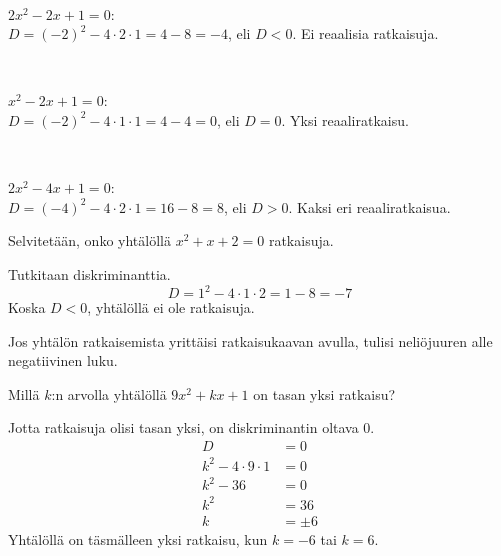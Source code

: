 \begin{esimerkki}
\ \\
\parbox{4.5cm}{
\begin{kuvaajapohja}{1}{-1}{3}{-1}{3}
\end{kuvaajapohja}
}
\parbox{6cm}{$2x^2-2x+1=0$:\\$D=(-2)^2-4 \cdot 2 \cdot 1=4-8=-4$, eli $D <0$. Ei reaalisia ratkaisuja.}
\\
\parbox{4.5cm}{
\begin{kuvaajapohja}{1}{-1}{3}{-1}{3}
\end{kuvaajapohja}
}
\parbox{6cm}{$x^2-2x+1=0$:\\$D=(-2)^2-4 \cdot 1 \cdot 1=4-4=0$, eli $D = 0$. Yksi reaaliratkaisu.}
\\
\parbox{4.5cm}{
\begin{kuvaajapohja}{1}{-1}{3}{-2}{2}
\end{kuvaajapohja}
}
\parbox{6cm}{$2x^2-4x+1=0$:\\$D=(-4)^2-4 \cdot 2 \cdot 1=16-8=8$, eli $D > 0$. Kaksi eri reaaliratkaisua.}
\end{esimerkki}

\newpage

\begin{esimerkki}
Selvitetään, onko yhtälöllä $x^2+x+2=0$ ratkaisuja.

Tutkitaan diskriminanttia.
\[D=1^2-4\cdot 1 \cdot 2 = 1-8 = -7\]
Koska $D<0$, yhtälöllä ei ole ratkaisuja.

Jos yhtälön ratkaisemista yrittäisi ratkaisukaavan avulla, tulisi
neliöjuuren alle negatiivinen luku.
\end{esimerkki}

\begin{esimerkki}
Millä $k$:n arvolla yhtälöllä $9x^2+kx+1$ on tasan yksi ratkaisu?

Jotta ratkaisuja olisi tasan yksi, on diskriminantin oltava 0.
\begin{align*}
D &= 0\\
k^2-4\cdot 9\cdot 1 &= 0\\
k^2-36 &= 0\\
k^2 &= 36\\
k &= \pm 6
\end{align*}
Yhtälöllä on täsmälleen yksi ratkaisu, kun $k=-6$ tai $k=6$.
\end{esimerkki}

